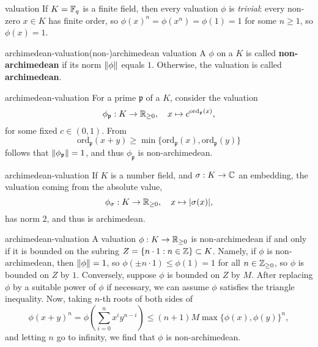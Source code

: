 \begin{example}{valuation}
    If $K = \mathbb{F}_q$ is a finite field, then every valuation $\phi$ is \textit{trivial}: every non-zero $x \in K$ has finite order, so $\phi(x)^n = \phi(x^n) = \phi(1) = 1$ for some $n \ge 1$, so $\phi(x) = 1$.
\end{example}

\begin{topic}{archimedean-valuation}{(non-)archimedean valuation}
    A  $\phi$ on a  $K$ is called \textbf{non-archimedean} if its norm $\left\|\phi\right\|$ equals $1$. Otherwise, the valuation is called \textbf{archimedean}.
\end{topic}

\begin{example}{archimedean-valuation}
    For a prime $\mathfrak{p}$ of a  $K$, consider the valuation
    \[ \phi_\mathfrak{p} : K \to \mathbb{R}_{\ge 0}, \quad x \mapsto c^{\text{ord}_\mathfrak{p}(x)} , \]
    for some fixed $c \in (0, 1)$. From
    \[ \text{ord}_\mathfrak{p}(x + y) \ge \min \{ \text{ord}_\mathfrak{p}(x), \text{ord}_\mathfrak{p}(y) \} \]
    follows that $\left\|\phi_\mathfrak{p}\right\| = 1$, and thus $\phi_\mathfrak{p}$ is non-archimedean.
\end{example}

\begin{example}{archimedean-valuation}
    If $K$ is a number field, and $\sigma : K \to \mathbb{C}$ an embedding, the valuation coming from the absolute value,
    \[ \phi_\sigma : K \to \mathbb{R}_{\ge 0}, \quad x \mapsto |\sigma(x)| , \]
    has norm $2$, and thus is archimedean.
\end{example}

\begin{example}{archimedean-valuation}
    A valuation $\phi : K \to \mathbb{R}_{\ge 0}$ is non-archimedean if and only if it is bounded on the subring $Z = \{ n \cdot 1 : n \in \mathbb{Z} \} \subset K$. Namely, if $\phi$ is non-archimedean, then $\left\|\phi\right\| = 1$, so $\phi(\pm n \cdot 1) \le \phi(1) = 1$ for all $n \in \mathbb{Z}_{\ge 0}$, so $\phi$ is bounded on $Z$ by $1$. Conversely, suppose $\phi$ is bounded on $Z$ by $M$. After replacing $\phi$ by a suitable power of $\phi$ if necessary, we can assume $\phi$ satisfies the triangle inequality. Now, taking $n$-th roots of both sides of
    \[ \phi(x + y)^n = \phi \left( \sum_{i = 0}^{n} x^i y^{n - i} \right) \le (n + 1) M \max \{ \phi(x), \phi(y) \}^n , \]
    and letting $n$ go to infinity, we find that $\phi$ is non-archimedean.
\end{example}

